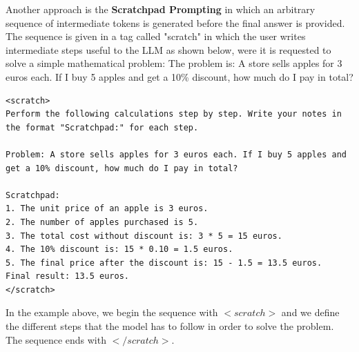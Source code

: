 Another approach is the \textbf{Scratchpad Prompting} in which an arbitrary sequence of intermediate tokens is generated before the final answer is provided. 
The sequence is given in a tag called "scratch" \cite{scratch,nye2021show} in which the user writes intermediate steps useful to the LLM as shown below, were it is requested to solve a simple mathematical problem:
The problem is: A store sells apples for 3 euros each. If I buy 5 apples and get a 10\% discount, how much do I pay in total?
\begin{lstlisting}
<scratch>
Perform the following calculations step by step. Write your notes in the format "Scratchpad:" for each step.

Problem: A store sells apples for 3 euros each. If I buy 5 apples and get a 10% discount, how much do I pay in total?

Scratchpad:
1. The unit price of an apple is 3 euros.
2. The number of apples purchased is 5.
3. The total cost without discount is: 3 * 5 = 15 euros.
4. The 10% discount is: 15 * 0.10 = 1.5 euros.
5. The final price after the discount is: 15 - 1.5 = 13.5 euros.
Final result: 13.5 euros.
</scratch>
\end{lstlisting}
In the example above, we begin the sequence with $<scratch>$ and we define the different steps that the model has to follow in order to solve the problem. The sequence ends with $</scratch>$.


